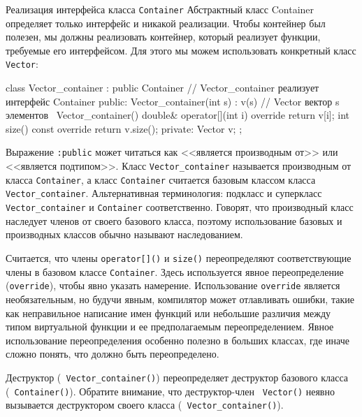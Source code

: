 \documentclass[
    8pt,
    hyperref={pdfencoding=unicode}
    ]{beamer}
\theoremstyle{definition}
\begin{document}
\begin{frame}{Реализация интерфейса класса \texttt{Container}}
    Абстрактный класс Container определяет только интерфейс и никакой реализации. 
    Чтобы контейнер был полезен, мы должны реализовать контейнер, который реализует функции, требуемые его интерфейсом. 
    Для этого мы можем использовать конкретный класс \texttt{Vector}:
    \begin{cppcode}
        class Vector_container : public Container { // Vector_container реализует интерфейс Container
          public:
            Vector_container(int s) : v(s) { } // Vector вектор s элементов
            ~Vector_container() {}
            double& operator[](int i) override { return v[i]; }
            int size() const override { return v.size(); }
            private:
            Vector v;
        };
    \end{cppcode}
    Выражение \texttt{:public} может читаться как <<является производным от>> или <<является подтипом>>. Класс 
    \texttt{Vector_container} называется производным от класса \texttt{Container}, а класс \texttt{Container} 
    считается базовым классом класса \texttt{Vector_container}. 
    Альтернативная терминология: подкласс и суперкласс \texttt{Vector_container} и \texttt{Container} соответственно.
    Говорят, что производный класс наследует членов от своего базового класса, поэтому использование базовых и производных классов 
    обычно называют наследованием.
    
     \vspace{4mm}
    
    Считается, что члены \texttt{operator[]()} и \texttt{size()} переопределяют
    соответствующие члены в базовом классе \texttt{Container}.
    Здесь используется явное переопределение (\texttt{override}), чтобы явно указать намерение. Использование 
    \texttt{override} является необязательным, но будучи явным, компилятор может отлавливать ошибки, такие как неправильное 
    написание имен функций или небольшие различия между типом виртуальной функции и ее предполагаемым переопределением. Явное 
    использование переопределения особенно полезно в больших классах, где иначе сложно понять, что должно быть переопределено.
    
    \vspace{4mm}
    
    Деструктор (\texttt{~Vector_container()}) переопределяет деструктор базового класса (\texttt{~Container()}). 
    Обратите внимание, что деструктор-член \texttt{~Vector()} неявно вызывается деструктором своего класса 
    (\texttt{~Vector_container()}).
    

\end{frame}
\end{document}
